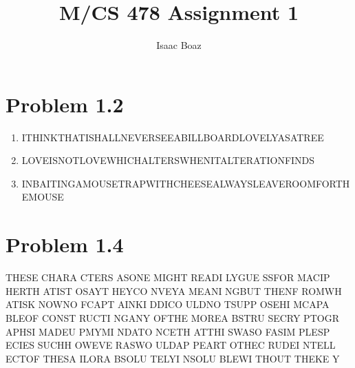 \documentclass{article}
\title{\vspace{-4em}M/CS 478 Assignment 1}
\author{Isaac Boaz}
\begin{document}
\maketitle

\section*{Problem 1.2}
\begin{enumerate}[label=(\alph*)]
    \item ITHINKTHATISHALLNEVERSEEABILLBOARDLOVELYASATREE
    \item LOVEISNOTLOVEWHICHALTERSWHENITALTERATIONFINDS
    \item INBAITINGAMOUSETRAPWITHCHEESEALWAYSLEAVEROOMFORTHEMOUSE
\end{enumerate}

\section*{Problem 1.4}
THESE CHARA CTERS ASONE MIGHT READI LYGUE SSFOR MACIP HERTH ATIST OSAYT HEYCO
NVEYA MEANI NGBUT THENF ROMWH ATISK NOWNO FCAPT AINKI DDICO ULDNO TSUPP
OSEHI MCAPA BLEOF CONST RUCTI NGANY OFTHE MOREA BSTRU SECRY PTOGR APHSI MADEU
PMYMI NDATO NCETH ATTHI SWASO FASIM PLESP ECIES SUCHH OWEVE RASWO ULDAP PEART
OTHEC RUDEI NTELL ECTOF THESA ILORA BSOLU TELYI NSOLU BLEWI THOUT THEKE Y
\end{document}
